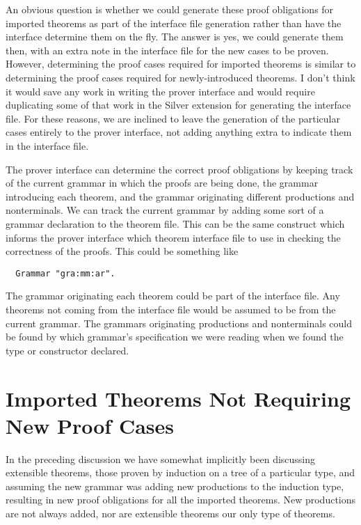 \documentclass[11pt]{article}
\begin{document}
An obvious question is whether we could generate these proof
obligations for imported theorems as part of the interface file
generation rather than have the interface determine them on the fly.
The answer is yes, we could generate them then, with an extra note in
the interface file for the new cases to be proven.
%
However, determining the proof cases required for imported theorems is
similar to determining the proof cases required for newly-introduced
theorems.  I don't think it would save any work in writing the prover
interface and would require duplicating some of that work in the
Silver extension for generating the interface file.
%
For these reasons, we are inclined to leave the generation of the
particular cases entirely to the prover interface, not adding anything
extra to indicate them in the interface file.


The prover interface can determine the correct proof obligations by
keeping track of the current grammar in which the proofs are being
done, the grammar introducing each theorem, and the grammar
originating different productions and nonterminals.
%
We can track the current grammar by adding some sort of a grammar
declaration to the theorem file.  This can be the same construct which
informs the prover interface which theorem interface file to use in
checking the correctness of the proofs.  This could be something like
\begin{lstlisting}
  Grammar "gra:mm:ar".
\end{lstlisting}
%
The grammar originating each theorem could be part of the interface
file.  Any theorems not coming from the interface file would be
assumed to be from the current grammar.
%
The grammars originating productions and nonterminals could be found
by which grammar's specification we were reading when we found the
type or constructor declared.





\section{Imported Theorems Not Requiring New Proof Cases}

In the preceding discussion we have somewhat implicitly been
discussing extensible theorems, those proven by induction on a tree of
a particular type, and assuming the new grammar was adding new
productions to the induction type, resulting in new proof obligations
for all the imported theorems.  New productions are not always added,
nor are extensible theorems our only type of theorems.
\end{document}
